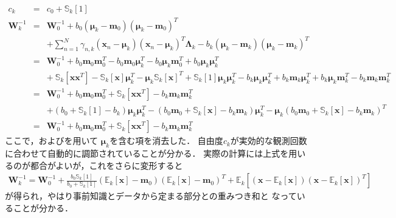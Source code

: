 \begin{eqnarray}
c_{k} &=& c_0 + \mathbb{S}_{k}[1]
\label{eq:ck}\\
\bm{W}_{k}^{-1} 
&=& 
\bm{W}_0^{-1}
+ b_0 (\bm\mu_{k} - \bm{m}_0)(\bm\mu_{k} - \bm{m}_0)^T
\nonumber\\
&&
+ \sum_{n=1}^{N} \gamma_{n,k}
(\bm{x}_n - \bm\mu_{k})(\bm{x}_n - \bm\mu_{k})^T\bm\Lambda_{k}
- b_{k} (\bm\mu_{k} - \bm{m}_{k})(\bm\mu_{k} - \bm{m}_{k})^T
\nonumber\\
&=&
\bm{W}_0^{-1}
+ b_0\bm{m}_0\bm{m}_0^T
- b_0\bm{m}_0\bm\mu_{k}^T
- b_0\bm\mu_{k}\bm{m}_0^T
+ b_0\bm\mu_{k}\bm\mu_{k}^T
\nonumber\\
&&
+ \ \mathbb{S}_{k}[\bm{x}\bm{x}^T]
- \mathbb{S}_{k}[\bm{x}] \bm\mu_{k}^T
- \bm\mu_{k} \mathbb{S}_{k}[\bm{x}]^T
+ \mathbb{S}_{k}[1] \bm\mu_{k}\bm\mu_{k}^T
- b_{k}\bm\mu_{k}\bm\mu_{k}^T
+ b_{k}\bm{m}_{k}\bm\mu_{k}^T
+ b_{k}\bm\mu_{k}\bm{m}_{k}^T
- b_{k}\bm{m}_{k}\bm{m}_{k}^T
\nonumber\\
&=& 
\bm{W}_0^{-1}
+ b_0\bm{m}_0\bm{m}_0^T
+ \mathbb{S}_{k}[\bm{x}\bm{x}^T]
- b_{k}\bm{m}_{k}\bm{m}_{k}^T
\nonumber\\
&&
+ \left(b_0 + \mathbb{S}_{k}[1] - b_{k}\right)
\bm\mu_{k}\bm\mu_{k}^T
- \left(b_0\bm{m}_0 + \mathbb{S}_{k}[\bm{x}] - b_{k}\bm{m}_{k}\right)\bm\mu_{k}^T
- \bm\mu_{k}\left(b_0\bm{m}_0 + \mathbb{S}_{k}[\bm{x}] - b_{k}\bm{m}_{k}\right)^T
\nonumber\\
&=& 
\bm{W}_0^{-1}
+ b_0\bm{m}_0\bm{m}_0^T
+ \mathbb{S}_{k}[\bm{x}\bm{x}^T]
- b_{k}\bm{m}_{k}\bm{m}_{k}^T
\label{eq:wk}
\end{eqnarray}
ここで，およびを用いて
$\bm\mu_{k}$を含む項を消去した．
自由度$c_{k}$が実効的な観測回数に合わせて自動的に調節されていることが分かる．
実際の計算には上式を用いるのが都合がよいが，これをさらに変形すると
\begin{eqnarray}
 \bm{W}_{k}^{-1} 
= \bm{W}_0^{-1} 
+ \frac{b_0\mathbb{S}_{k}[1]}{b_0 + \mathbb{S}_{k}[1]}
\left(\mathbb{E}_{k}[\bm{x}] - \bm{m}_0\right)
\left(\mathbb{E}_{k}[\bm{x}] - \bm{m}_0\right)^T
+ \mathbb{E}_{k}\left[(\bm{x} - \mathbb{E}_{k}[\bm{x}])(\bm{x} - \mathbb{E}_{k}[\bm{x}])^T\right]
\end{eqnarray}
が得られ，やはり事前知識とデータから定まる部分との重みつき和と
なっていることが分かる．

